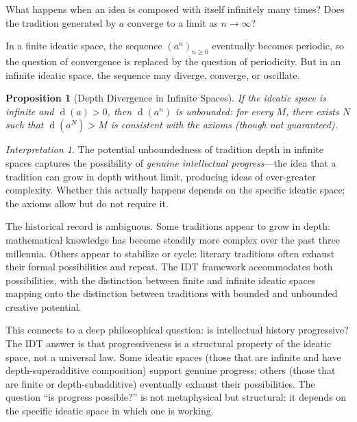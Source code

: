 \documentclass[11pt,openany]{book}
\theoremstyle{definition}
\theoremstyle{plain}
\newtheorem{proposition}[axiom]{Proposition}
\theoremstyle{remark}
\newtheorem{interpretation}[axiom]{Interpretation}
\newcommand{\depth}{\operatorname{d}}       %
\begin{document}
What happens when an idea is composed with itself infinitely many times? Does the tradition generated by $a$ converge to a limit as $n \to \infty$?

In a finite ideatic space, the sequence $(a^n)_{n \geq 0}$ eventually becomes periodic, so the question of convergence is replaced by the question of periodicity. But in an infinite ideatic space, the sequence may diverge, converge, or oscillate.

\begin{proposition}[Depth Divergence in Infinite Spaces]
If the ideatic space is infinite and $\depth(a) > 0$, then $\depth(a^n)$ is unbounded: for every $M$, there exists $N$ such that $\depth(a^N) > M$ is \emph{consistent with the axioms} (though not guaranteed).
\end{proposition}

\begin{interpretation}
The potential unboundedness of tradition depth in infinite spaces captures the possibility of \emph{genuine intellectual progress}---the idea that a tradition can grow in depth without limit, producing ideas of ever-greater complexity. Whether this actually happens depends on the specific ideatic space; the axioms allow but do not require it.

The historical record is ambiguous. Some traditions appear to grow in depth: mathematical knowledge has become steadily more complex over the past three millennia. Others appear to stabilize or cycle: literary traditions often exhaust their formal possibilities and repeat. The IDT framework accommodates both possibilities, with the distinction between finite and infinite ideatic spaces mapping onto the distinction between traditions with bounded and unbounded creative potential.

This connects to a deep philosophical question: is intellectual history progressive? The IDT answer is that progressiveness is a structural property of the ideatic space, not a universal law. Some ideatic spaces (those that are infinite and have depth-superadditive composition) support genuine progress; others (those that are finite or depth-subadditive) eventually exhaust their possibilities. The question ``is progress possible?'' is not metaphysical but structural: it depends on the specific ideatic space in which one is working.
\end{interpretation}

\end{document}
